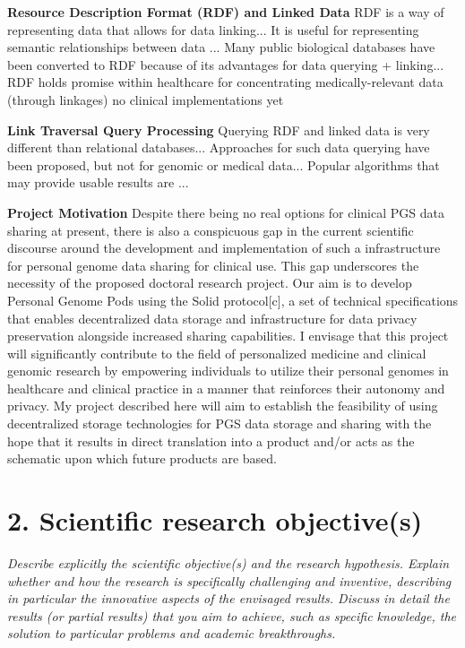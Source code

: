 \documentclass[11pt]{article}
\begin{document}
\textbf{Resource Description Format (RDF) and Linked Data}
RDF is a way of representing data that allows for data linking...
It is useful for representing semantic relationships between data ...
Many public biological databases have been converted to RDF because of its advantages for data querying + linking...
RDF holds promise within healthcare for concentrating medically-relevant data (through linkages)
no clinical implementations yet


\textbf{Link Traversal Query Processing}
Querying RDF and linked data is very different than relational databases...
Approaches for such data querying have been proposed, but not for genomic or medical data...
Popular algorithms that may provide usable results are ...


\textbf{Project Motivation}
Despite there being no real options for clinical PGS data sharing at present, there is also a conspicuous gap in the current scientific discourse around the development and implementation of such a infrastructure for personal genome data sharing for clinical use. 
This gap underscores the necessity of the proposed doctoral research project.
Our aim is to develop Personal Genome Pods using the Solid protocol[c], a set of technical specifications that enables decentralized data storage and infrastructure for data privacy preservation alongside increased sharing capabilities.  
I envisage that this project will significantly contribute to the field of personalized medicine and clinical genomic research by empowering individuals to utilize their personal genomes in healthcare and clinical practice in a manner that reinforces their autonomy and privacy. 
My project described here will aim to establish the feasibility of using decentralized storage technologies for PGS data storage and sharing with the hope that it results in direct translation into a product and/or acts as the schematic upon which future products are based. 


\section{2. Scientific research objective(s)}
\textit{Describe explicitly the scientific objective(s) and the research hypothesis. Explain whether and how the research is specifically challenging and inventive, describing in particular the innovative aspects of the envisaged results. Discuss in detail the results (or partial results) that you aim to achieve, such as specific knowledge, the solution to particular problems and academic breakthroughs.}
\end{document}
